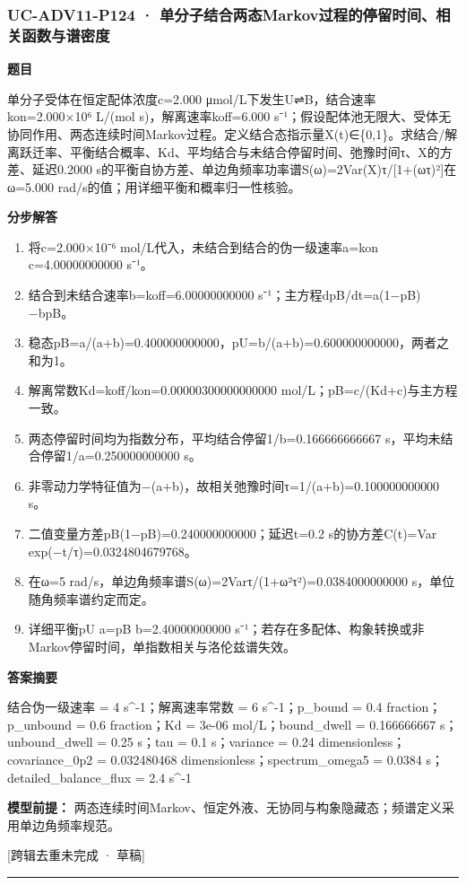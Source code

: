 \documentclass[UTF8,11pt,a4paper]{ctexart}
\begin{document}
\subsubsection*{UC-ADV11-P124 · 单分子结合两态Markov过程的停留时间、相关函数与谱密度}
\noindent\textbf{题目}\par
单分子受体在恒定配体浓度c=2.000 μmol/L下发生U⇌B，结合速率kon=2.000×10⁶ L/(mol s)，解离速率koff=6.000 s⁻¹；假设配体池无限大、受体无协同作用、两态连续时间Markov过程。定义结合态指示量X(t)∈\{0,1\}。求结合/解离跃迁率、平衡结合概率、Kd、平均结合与未结合停留时间、弛豫时间τ、X的方差、延迟0.2000 s的平衡自协方差、单边角频率功率谱S(ω)=2Var(X)τ/[1+(ωτ)²]在ω=5.000 rad/s的值；用详细平衡和概率归一性核验。\par
\medskip\noindent\textbf{分步解答}
\begin{enumerate}
\item 将c=2.000×10⁻⁶ mol/L代入，未结合到结合的伪一级速率a=kon c=4.00000000000 s⁻¹。
\item 结合到未结合速率b=koff=6.00000000000 s⁻¹；主方程dpB/dt=a(1−pB)−bpB。
\item 稳态pB=a/(a+b)=0.400000000000，pU=b/(a+b)=0.600000000000，两者之和为1。
\item 解离常数Kd=koff/kon=0.00000300000000000 mol/L；pB=c/(Kd+c)与主方程一致。
\item 两态停留时间均为指数分布，平均结合停留1/b=0.166666666667 s，平均未结合停留1/a=0.250000000000 s。
\item 非零动力学特征值为−(a+b)，故相关弛豫时间τ=1/(a+b)=0.100000000000 s。
\item 二值变量方差pB(1−pB)=0.240000000000；延迟t=0.2 s的协方差C(t)=Var exp(−t/τ)=0.0324804679768。
\item 在ω=5 rad/s，单边角频率谱S(ω)=2Varτ/(1+ω²τ²)=0.0384000000000 s，单位随角频率谱约定而定。
\item 详细平衡pU a=pB b=2.40000000000 s⁻¹；若存在多配体、构象转换或非Markov停留时间，单指数相关与洛伦兹谱失效。
\end{enumerate}
\noindent\textbf{答案摘要}\par
结合伪一级速率 = 4 s\textasciicircum{}-1；解离速率常数 = 6 s\textasciicircum{}-1；p\_bound = 0.4 fraction；p\_unbound = 0.6 fraction；Kd = 3e-06 mol/L；bound\_dwell = 0.166666667 s；unbound\_dwell = 0.25 s；tau = 0.1 s；variance = 0.24 dimensionless；covariance\_0p2 = 0.032480468 dimensionless；spectrum\_omega5 = 0.0384 s；detailed\_balance\_flux = 2.4 s\textasciicircum{}-1\par
\noindent\textbf{模型前提：}
两态连续时间Markov、恒定外液、无协同与构象隐藏态；频谱定义采用单边角频率规范。\par
\noindent\textcolor{red!65!black}{[跨辑去重未完成 · 草稿]} \par
\medskip\hrule\medskip
{}
\end{document}
